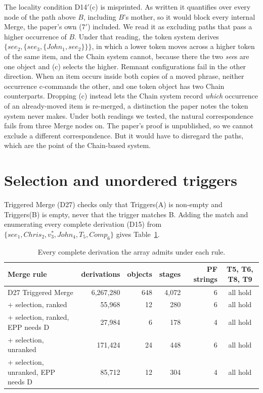 \documentclass[11pt,a4paper]{article}
\newcommand{\pf}[1]{\textit{#1}}
\begin{document}
The locality condition D14$'$(c) is misprinted. As written it quantifies over
every node of the path above $B$, including $B$'s mother, so it would block
every internal Merge, the paper's own (7$'$) included. We read it as
excluding paths that pass a higher occurrence of $B$. Under that reading, the
token system derives $\{\mathit{see}_2,\{\mathit{see}_3,\{\mathit{John}_1,
\mathit{see}_2\}\}\}$, in which a lower token moves across a higher token of
the same item, and the Chain system cannot, because there the two
\pf{see}s are one object and (c) selects the higher. Remnant configurations
fail in the other direction. When an item occurs inside both copies of a
moved phrase, neither occurrence c-commands the other, and one token object
has two Chain counterparts. Dropping (c) instead lets the Chain system record
\emph{which} occurrence of an already-moved item is re-merged, a distinction
the paper notes the token system never makes. Under both readings we tested,
the natural correspondence fails from three Merge nodes on. The
paper's proof is unpublished, so we cannot exclude a different
correspondence. But it would have to disregard the paths, which are the
point of the Chain-based system.

\section{Selection and unordered triggers}
\label{sec:selection}

Triggered Merge (D27) checks only that Triggers(A) is non-empty and
Triggers(B) is empty, never that the trigger matches B. Adding the match and
enumerating every complete derivation (D15) from
$\{\mathit{see}_1, \mathit{Chris}_2, v^*_3, \mathit{John}_4, T_5,
\mathit{Comp}_6\}$ gives Table~\ref{tab:selection}.

\begin{table}[htbp]
\centering
\footnotesize
\begin{tabular}{lrrrrc}
\toprule
Merge rule & derivations & objects & stages & PF strings & T5, T6, T8, T9 \\
\midrule
D27 Triggered Merge                &  6{,}267{,}280 & 648 & 4{,}072 & 6 & all hold \\
\quad + selection, ranked          &      55{,}968 &  12 &    280  & 6 & all hold \\
\quad + selection, ranked, EPP needs D & 27{,}984 &   6 &    178  & 4 & all hold \\
\quad + selection, unranked        &     171{,}424 &  24 &    448  & 6 & all hold \\
\quad + selection, unranked, EPP needs D & 85{,}712 & 12 &   304  & 4 & all hold \\
\bottomrule
\end{tabular}
\caption{Every complete derivation the array admits under each rule.}
\label{tab:selection}
\end{table}
\end{document}
